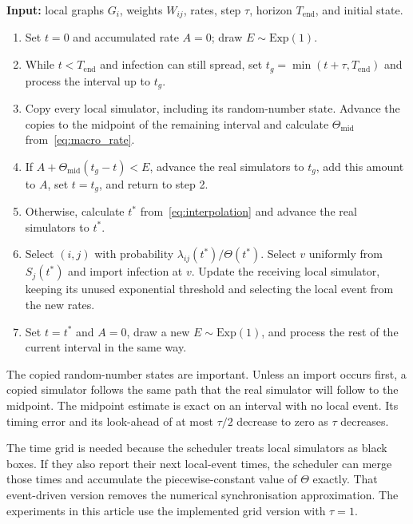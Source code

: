 \documentclass{ieeeaccess}
\newcommand{\Exp}{\mathrm{Exp}}
\begin{document}
\begin{algorithm}[tbp]
\color{black}
\caption{\textcolor{black}{Grid-synchronised two-scale simulation of one realisation.}}
\label{alg:scheduler}
\small

\textbf{Input:} local graphs $G_i$, weights $W_{ij}$, rates, step $\tau$, horizon $T_{\mathrm{end}}$, and initial state.
\begin{enumerate}
\item Set $t=0$ and accumulated rate $A=0$; draw $E\sim\Exp(1)$.
\item While $t<T_{\mathrm{end}}$ and infection can still spread, set $t_g=\min(t+\tau,T_{\mathrm{end}})$ and process the interval up to $t_g$.
\item Copy every local simulator, including its random-number state. Advance the copies to the midpoint of the remaining interval and calculate $\Theta_{\mathrm{mid}}$ from~\eqref{eq:macro_rate}.
\item If $A+\Theta_{\mathrm{mid}}(t_g-t)<E$, advance the real simulators to $t_g$, add this amount to $A$, set $t=t_g$, and return to step 2.
\item Otherwise, calculate $t^\ast$ from~\eqref{eq:interpolation} and advance the real simulators to $t^\ast$.
\item Select $(i,j)$ with probability $\lambda_{ij}(t^\ast)/\Theta(t^\ast)$. Select $v$ uniformly from $S_j(t^\ast)$ and import infection at $v$. Update the receiving local simulator, keeping its unused exponential threshold and selecting the local event from the new rates.
\item Set $t=t^\ast$ and $A=0$, draw a new $E\sim\Exp(1)$, and process the rest of the current interval in the same way.
\end{enumerate}

\end{algorithm}

The copied random-number states are important. Unless an import occurs first, a copied simulator follows the same path that the real simulator will follow to the midpoint. The midpoint estimate is exact on an interval with no local event. Its timing error and its look-ahead of at most $\tau/2$ decrease to zero as $\tau$ decreases.

The time grid is needed because the scheduler treats local simulators as black boxes. If they also report their next local-event times, the scheduler can merge those times and accumulate the piecewise-constant value of $\Theta$ exactly. That event-driven version removes the numerical synchronisation approximation. The experiments in this article use the implemented grid version with $\tau=1$.
\end{document}
